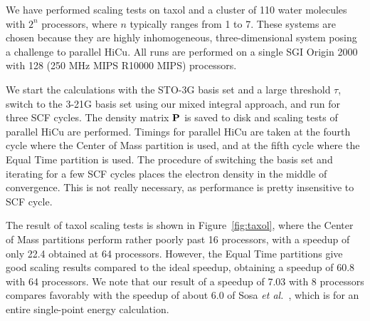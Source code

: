\commentoutA{\documentclass[prl,aps,twocolumn,showpacs,twocolumngrid,superbib]{revtex4}}
\begin{document}

We have performed scaling tests on taxol and a cluster of 110 water
molecules with $2^n$ processors, where $n$ typically ranges from 1 to
7.  These systems are chosen because they are highly inhomogeneous,
three-dimensional system posing a challenge to parallel HiCu.  
All runs are performed on a single SGI Origin 2000
with 128 (250 MHz MIPS R10000 MIPS) processors.

We start the calculations with the STO-3G basis set and a large 
threshold $\tau$, switch to the 3-21G basis set using our mixed
integral approach, and run for three SCF cycles.  The density matrix
${\bf P}$ is saved to disk and scaling tests of parallel HiCu are
performed.  Timings for parallel HiCu are taken at the fourth cycle where the
Center of Mass partition is used, and at the fifth cycle where the
Equal Time partition is used. The procedure of switching the basis set and 
iterating for a few SCF cycles places the electron density in the middle 
of convergence.  This is not really necessary, as performance is pretty 
insensitive to SCF cycle.  


The result of taxol scaling tests is shown in Figure~\ref{fig:taxol},
where the Center of Mass partitions perform rather poorly past 16 processors, with
a speedup of only 22.4 obtained at 64 processors.  However, the Equal
Time partitions give good scaling results compared to the ideal
speedup, obtaining a speedup of 60.8 with 64 processors.  We note that
our result of a speedup of 7.03 with 8 processors compares favorably
with the speedup of about 6.0 of Sosa {\it et al.}~\cite{Sosa_00v26},
which is for an entire single-point energy calculation.
\end{document}
